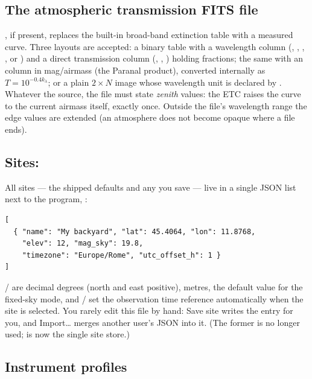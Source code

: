 \subsection{The atmospheric transmission FITS file}

, if present, replaces
the built-in broad-band extinction table with a measured curve. Three
layouts are accepted: a binary table with a wavelength column
(, , , ,
 or ) and a direct transmission column
(, , ) holding fractions;
the same with an  column in mag/airmass (the Paranal
product), converted internally as $T = 10^{-0.4 k_\lambda}$; or a plain
$2\times N$ image whose wavelength unit is declared by .
Whatever the source, the file must state \emph{zenith} values: the ETC
raises the curve to the current airmass itself, exactly once. Outside the
file's wavelength range the edge values are extended (an atmosphere does
not become opaque where a file ends).

\subsection{Sites: }

All sites --- the shipped defaults and any you save --- live in a single
JSON list next to the program, :

\begin{verbatim}
[
  { "name": "My backyard", "lat": 45.4064, "lon": 11.8768,
    "elev": 12, "mag_sky": 19.8,
    "timezone": "Europe/Rome", "utc_offset_h": 1 }
]
\end{verbatim}

/ are decimal degrees (north and east positive),
 metres,  the default value for the fixed-sky
mode, and / set the observation time
reference automatically when the site is selected. You rarely edit this
file by hand: \textsf{Save site} writes the entry for you, and
\textsf{Import\ldots} merges another user's JSON into it. (The former
 is no longer used;  is now
the single site store.)

\subsection{Instrument profiles}
\label{sec:profiles}

